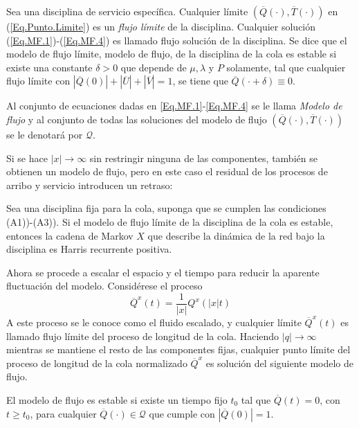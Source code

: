 \begin{Def}\label{Def.Modelo.Flujo}
Sea una disciplina de servicio espec\'ifica. Cualquier l\'imite
$\left(\overline{Q}\left(\cdot\right),\overline{T}\left(\cdot\right)\right)$
en (\ref{Eq.Punto.Limite}) es un {\em flujo l\'imite} de la
disciplina. Cualquier soluci\'on (\ref{Eq.MF.1})-(\ref{Eq.MF.4})
es llamado flujo soluci\'on de la disciplina. Se dice que el
modelo de flujo l\'imite, modelo de flujo, de la disciplina de la
cola es estable si existe una constante $\delta>0$ que depende de
$\mu,\lambda$ y $P$ solamente, tal que cualquier flujo l\'imite
con
$|\overline{Q}\left(0\right)|+|\overline{U}|+|\overline{V}|=1$, se
tiene que $\overline{Q}\left(\cdot+\delta\right)\equiv0$.
\end{Def}

Al conjunto de ecuaciones dadas en \ref{Eq.MF.1}-\ref{Eq.MF.4} se
le llama {\em Modelo de flujo} y al conjunto de todas las
soluciones del modelo de flujo
$\left(\overline{Q}\left(\cdot\right),\overline{T}
\left(\cdot\right)\right)$ se le denotar\'a por $\mathcal{Q}$.

Si se hace $|x|\rightarrow\infty$ sin restringir ninguna de las
componentes, tambi\'en se obtienen un modelo de flujo, pero en
este caso el residual de los procesos de arribo y servicio
introducen un retraso:
\begin{Teo}\label{Tma.4.2.Dai}
Sea una disciplina fija para la cola, suponga que se cumplen las
condiciones (A1))-(A3)). Si el modelo de flujo l\'imite de la
disciplina de la cola es estable, entonces la cadena de Markov $X$
que describe la din\'amica de la red bajo la disciplina es Harris
recurrente positiva.
\end{Teo}

Ahora se procede a escalar el espacio y el tiempo para reducir la
aparente fluctuaci\'on del modelo. Consid\'erese el proceso
\begin{equation}\label{Eq.3.7}
\overline{Q}^{x}\left(t\right)=\frac{1}{|x|}Q^{x}\left(|x|t\right)
\end{equation}
A este proceso se le conoce como el fluido escalado, y cualquier
l\'imite $\overline{Q}^{x}\left(t\right)$ es llamado flujo
l\'imite del proceso de longitud de la cola. Haciendo
$|q|\rightarrow\infty$ mientras se mantiene el resto de las
componentes fijas, cualquier punto l\'imite del proceso de
longitud de la cola normalizado $\overline{Q}^{x}$ es soluci\'on
del siguiente modelo de flujo.


\begin{Def}
El modelo de flujo es estable si existe un tiempo fijo $t_{0}$ tal
que $\overline{Q}\left(t\right)=0$, con $t\geq t_{0}$, para
cualquier $\overline{Q}\left(\cdot\right)\in\mathcal{Q}$ que
cumple con $|\overline{Q}\left(0\right)|=1$.
\end{Def}


